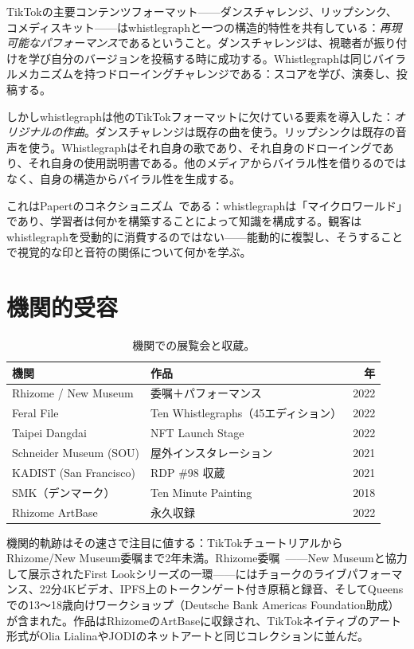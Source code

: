 \documentclass[10pt,letterpaper,twocolumn]{article}
\begin{document}
TikTokの主要コンテンツフォーマット——ダンスチャレンジ、リップシンク、コメディスキット——はwhistlegraphと一つの構造的特性を共有している：\emph{再現可能なパフォーマンス}であるということ。ダンスチャレンジは、視聴者が振り付けを学び自分のバージョンを投稿する時に成功する。Whistlegraphは同じバイラルメカニズムを持つドローイングチャレンジである：スコアを学び、演奏し、投稿する。

しかしwhistlegraphは他のTikTokフォーマットに欠けている要素を導入した：\emph{オリジナルの作曲}。ダンスチャレンジは既存の曲を使う。リップシンクは既存の音声を使う。Whistlegraphはそれ自身の歌であり、それ自身のドローイングであり、それ自身の使用説明書である。他のメディアからバイラル性を借りるのではなく、自身の構造からバイラル性を生成する。

これはPapertのコネクショニズム~\citep{papert1980mindstorms}である：whistlegraphは「マイクロワールド」であり、学習者は何かを構築することによって知識を構成する。観客はwhistlegraphを受動的に消費するのではない——能動的に複製し、そうすることで視覚的な印と音符の関係について何かを学ぶ。

\section{機関的受容}

\begin{table}[h]
\small
\centering
\begin{tabularx}{\columnwidth}{Xlr}
\toprule
\textbf{機関} & \textbf{作品} & \textbf{年} \\
\midrule
Rhizome / New Museum & 委嘱＋パフォーマンス & 2022 \\
Feral File & Ten Whistlegraphs（45エディション） & 2022 \\
Taipei Dangdai & NFT Launch Stage & 2022 \\
Schneider Museum (SOU) & 屋外インスタレーション & 2021 \\
KADIST (San Francisco) & RDP \#98 収蔵 & 2021 \\
SMK（デンマーク） & Ten Minute Painting & 2018 \\
Rhizome ArtBase & 永久収録 & 2022 \\
\bottomrule
\end{tabularx}
\caption{機関での展覧会と収蔵。}
\label{tab:institutions}
\end{table}

機関的軌跡はその速さで注目に値する：TikTokチュートリアルからRhizome/New Museum委嘱まで2年未満。Rhizome委嘱~\citep{rhizome2022longest}——New Museumと協力して展示されたFirst Lookシリーズの一環——にはチョークのライブパフォーマンス、22分4Kビデオ、IPFS上のトークンゲート付き原稿と録音、そしてQueensでの13〜18歳向けワークショップ（Deutsche Bank Americas Foundation助成）が含まれた。作品はRhizomeのArtBaseに収録され、TikTokネイティブのアート形式がOlia LialinaやJODIのネットアートと同じコレクションに並んだ。
\end{document}
